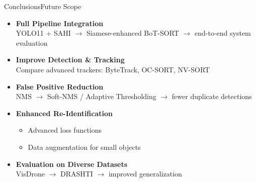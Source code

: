 \documentclass[10pt]{beamer}
\begin{document}
	
	\begin{frame}{Conclusions}{Future Scope}
		
		\small
		
		\begin{itemize}
			
			\item \textbf{Full Pipeline Integration} \\
			YOLO11 + SAHI $\rightarrow$ Siamese-enhanced BoT-SORT $\rightarrow$ end-to-end system evaluation
			
			\vspace{0.2cm}
			
			\item \textbf{Improve Detection \& Tracking} \\
			Compare advanced trackers: ByteTrack, OC-SORT, NV-SORT
			
			\vspace{0.2cm}
			
			\item \textbf{False Positive Reduction} \\
			NMS $\rightarrow$ Soft-NMS / Adaptive Thresholding $\rightarrow$ fewer duplicate detections
			
			\vspace{0.2cm}
			
			\item \textbf{Enhanced Re-Identification} \\
			\begin{itemize}
				\item Advanced loss functions
				\item Data augmentation for small objects
			\end{itemize}
			
			\vspace{0.2cm}
			
			\item \textbf{Evaluation on Diverse Datasets} \\
			VisDrone $\rightarrow$ DRASHTI $\rightarrow$ improved generalization
			
		\end{itemize}
		
	\end{frame}
	
	
	
\end{document}
